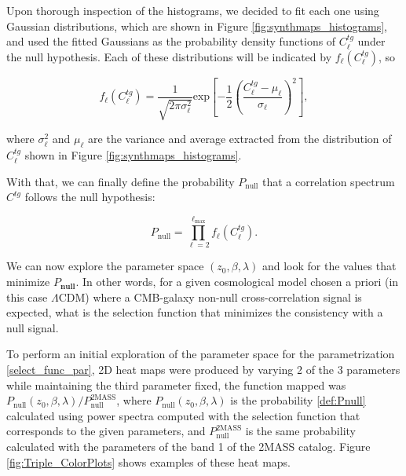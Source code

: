 \documentclass[openany,a4paper,12pt,oneside]{book}
\begin{document}
\begin{spacing}{1.5}
Upon thorough inspection of the histograms, we decided to fit each one using Gaussian distributions, which are shown in Figure \ref{fig:synthmaps_histograms}, and used the fitted Gaussians as the probability density functions of $C^{tg}_{\ell}$ under the null hypothesis. Each of these distributions will be indicated by $f_\ell\left(C^{tg}_\ell\right)$, so

\begin{equation}\label{f(ctgl)}
	f_\ell\left(C^{tg}_\ell\right)=\frac{1}{\sqrt{2\pi\sigma_\ell^2}}\text{exp}\left[-\frac{1}{2}\left(\frac{C^{tg}_\ell-\mu_\ell}{\sigma_\ell}\right)^2\right],
\end{equation}

\noindent where $\sigma_\ell^2$ and $\mu_\ell$ are the variance and average extracted from the distribution of $C_\ell^{tg}$ shown in Figure \ref{fig:synthmaps_histograms}.

With that, we can finally define the probability $P_\text{null}$ that a correlation spectrum $C^{tg}$ follows the null hypothesis:

\begin{equation}\label{def:Pnull}
	P_\text{null}=\prod_{\ell=2}^{\ell_\text{max}} f_\ell\left(C^{tg}_\ell\right).
\end{equation}

We can now explore the parameter space $(z_0,\beta,\lambda)$ and look for the values that minimize $P_\textbf{null}$. In other words, for a given cosmological model chosen a priori (in this case $\Lambda$CDM) where a CMB-galaxy non-null cross-correlation signal is expected, what is the selection function that minimizes the consistency with a null signal.

To perform an initial exploration of the parameter space for the parametrization \eqref{select_func_par}, 2D heat maps were produced by varying 2 of the 3 parameters while maintaining the third parameter fixed, the function mapped was $P_\text{null}(z_0, \beta,\lambda)/P_\text{null}^\text{2MASS}$, where $P_\text{null}(z_0, \beta,\lambda)$ is the probability \eqref{def:Pnull} calculated using power spectra computed with the selection function that corresponds to the given parameters, and $P_\text{null}^\text{2MASS}$ is the same probability calculated with the parameters of the band 1 of the 2MASS catalog. Figure \ref{fig:Triple_ColorPlots} shows examples of these heat maps.


\end{spacing}
\end{document}
